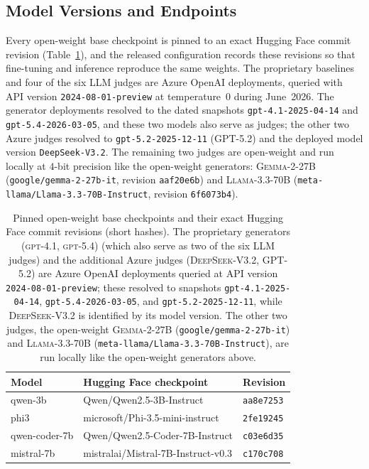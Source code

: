 \documentclass[letterpaper]{article}
\begin{document}
\subsection{Model Versions and Endpoints}
{\sloppy\setlength{\emergencystretch}{3em}
Every open-weight base checkpoint is pinned to an exact Hugging Face commit revision (Table~\ref{tab:modelversions}), and the released configuration records these revisions so that fine-tuning and inference reproduce the same weights. The proprietary baselines and four of the six LLM judges are Azure OpenAI deployments, queried with API version \texttt{2024-08-01-preview} at temperature~$0$ during June~2026. The generator deployments resolved to the dated snapshots \texttt{gpt-4.1-2025-04-14} and \texttt{gpt-5.4-2026-03-05}, and these two models also serve as judges; the other two Azure judges resolved to \texttt{gpt-5.2-2025-12-11} (\textsc{GPT-5.2}) and the deployed model version \texttt{DeepSeek-V3.2}. The remaining two judges are open-weight and run locally at $4$-bit precision like the open-weight generators: \textsc{Gemma-2-27B} (\texttt{google/gemma-2-27b-it}, revision \texttt{aaf20e6b}) and \textsc{Llama-3.3-70B} (\texttt{meta-llama/Llama-3.3-70B-Instruct}, revision \texttt{6f6073b4}).\par}

\begin{table}[t]
\centering
\small
\begin{tabular}{@{}lll@{}}
\toprule
\textbf{Model} & \textbf{Hugging Face checkpoint} & \textbf{Revision} \\
\midrule
qwen-3b       & Qwen/Qwen2.5-3B-Instruct           & \texttt{aa8e7253} \\
phi3          & microsoft/Phi-3.5-mini-instruct    & \texttt{2fe19245} \\
qwen-coder-7b & Qwen/Qwen2.5-Coder-7B-Instruct     & \texttt{c03e6d35} \\
mistral-7b    & mistralai/Mistral-7B-Instruct-v0.3 & \texttt{c170c708} \\
\bottomrule
\end{tabular}
\caption{Pinned open-weight base checkpoints and their exact Hugging Face commit revisions (short hashes). The proprietary generators (\textsc{gpt-4.1}, \textsc{gpt-5.4}) (which also serve as two of the six LLM judges) and the additional Azure judges (\textsc{DeepSeek-V3.2}, \textsc{GPT-5.2}) are Azure OpenAI deployments queried at API version \texttt{2024-08-01-preview}; these resolved to snapshots \texttt{gpt-4.1-2025-04-14}, \texttt{gpt-5.4-2026-03-05}, and \texttt{gpt-5.2-2025-12-11}, while \textsc{DeepSeek-V3.2} is identified by its model version. The other two judges, the open-weight \textsc{Gemma-2-27B} (\texttt{google/gemma-2-27b-it}) and \textsc{Llama-3.3-70B} (\texttt{meta-llama/Llama-3.3-70B-Instruct}), are run locally like the open-weight generators above.}
\label{tab:modelversions}
\end{table}
\end{document}
